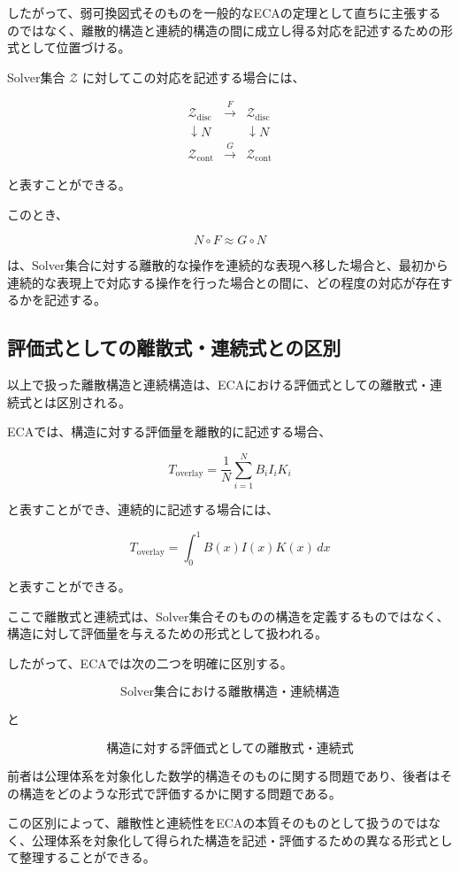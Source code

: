 したがって、弱可換図式そのものを一般的なECAの定理として直ちに主張するのではなく、離散的構造と連続的構造の間に成立し得る対応を記述するための形式として位置づける。

Solver集合 $\mathcal{Z}$ に対してこの対応を記述する場合には、

\[
\begin{array}{ccc}
\mathcal{Z}_{\mathrm{disc}}
& \xrightarrow{F} &
\mathcal{Z}_{\mathrm{disc}}
\\
\downarrow N
&&
\downarrow N
\\
\mathcal{Z}_{\mathrm{cont}}
& \xrightarrow{G} &
\mathcal{Z}_{\mathrm{cont}}
\end{array}
\]

と表すことができる。

このとき、

\[
N\circ F
\approx
G\circ N
\]

は、Solver集合に対する離散的な操作を連続的な表現へ移した場合と、最初から連続的な表現上で対応する操作を行った場合との間に、どの程度の対応が存在するかを記述する。

\subsection{評価式としての離散式・連続式との区別}

以上で扱った離散構造と連続構造は、ECAにおける評価式としての離散式・連続式とは区別される。

ECAでは、構造に対する評価量を離散的に記述する場合、

\[
T_{\mathrm{overlay}}=\frac{1}{N}\sum_{i=1}^{N}B_iI_iK_i
\]

と表すことができ、連続的に記述する場合には、

\[
T_{\mathrm{overlay}}=\int_0^1 B(x)I(x)K(x)\,dx
\]

と表すことができる。

ここで離散式と連続式は、Solver集合そのものの構造を定義するものではなく、構造に対して評価量を与えるための形式として扱われる。

したがって、ECAでは次の二つを明確に区別する。

\[
\text{Solver集合における離散構造・連続構造}
\]

と

\[
\text{構造に対する評価式としての離散式・連続式}
\]

前者は公理体系を対象化した数学的構造そのものに関する問題であり、後者はその構造をどのような形式で評価するかに関する問題である。

この区別によって、離散性と連続性をECAの本質そのものとして扱うのではなく、公理体系を対象化して得られた構造を記述・評価するための異なる形式として整理することができる。

